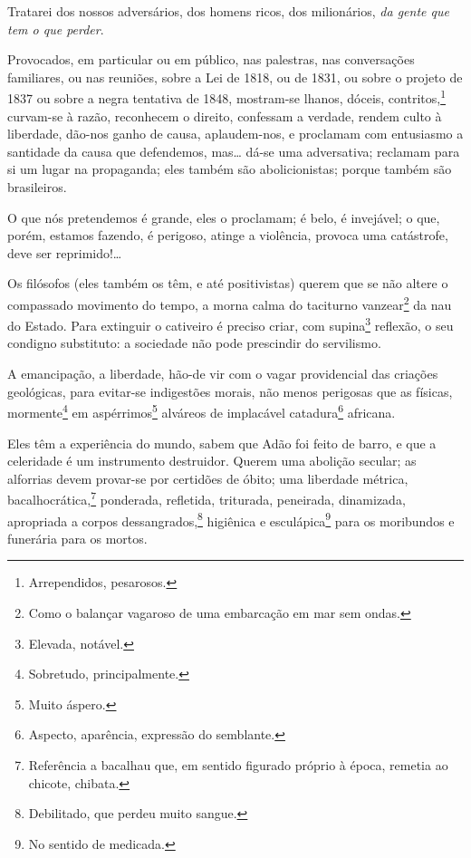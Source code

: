 Tratarei dos nossos adversários, dos homens ricos, dos milionários,
\emph{da gente que tem o que perder}.

Provocados, em particular ou em público, nas palestras, nas conversações
familiares, ou nas reuniões, sobre a Lei de 1818, ou de 1831, ou sobre o
projeto de 1837 ou sobre a negra tentativa de 1848, mostram-se lhanos,
dóceis, contritos,\footnote{Arrependidos, pesarosos.} curvam-se à
razão, reconhecem o direito, confessam a verdade, rendem culto à
liberdade, dão-nos ganho de causa, aplaudem-nos, e proclamam com
entusiasmo a santidade da causa que defendemos, mas\ldots{} dá-se uma
adversativa; reclamam para si um lugar na propaganda; eles também são
abolicionistas; porque também são brasileiros.

O que nós pretendemos é grande, eles o proclamam; é belo, é invejável; o
que, porém, estamos fazendo, é perigoso, atinge a violência, provoca uma
catástrofe, deve ser reprimido!\ldots{}

Os filósofos (eles também os têm, e até positivistas) querem que se não
altere o compassado movimento do tempo, a morna calma do taciturno
vanzear\footnote{Como o balançar vagaroso de uma embarcação em mar sem
  ondas.} da nau do Estado. Para extinguir o cativeiro é preciso criar,
com supina\footnote{Elevada, notável.} reflexão, o seu condigno
substituto: a sociedade não pode prescindir do servilismo.

A emancipação, a liberdade, hão-de vir com o vagar providencial das
criações geológicas, para evitar-se indigestões morais, não menos
perigosas que as físicas, mormente\footnote{Sobretudo, principalmente.}
em aspérrimos\footnote{Muito áspero.} alváreos de implacável
catadura\footnote{Aspecto, aparência, expressão do semblante.}
africana.

Eles têm a experiência do mundo, sabem que Adão foi feito de barro, e 
que a celeridade é um instrumento destruidor. Querem uma abolição
secular; as alforrias devem provar-se por certidões de óbito; uma
liberdade métrica, bacalhocrática,\footnote{Referência a bacalhau que,
  em sentido figurado próprio à época, remetia ao chicote, chibata.}
ponderada, refletida, triturada, peneirada, dinamizada, apropriada a
corpos dessangrados,\footnote{Debilitado, que perdeu muito sangue.}
higiênica e esculápica\footnote{No sentido de medicada.} para os
moribundos e funerária para os mortos.

